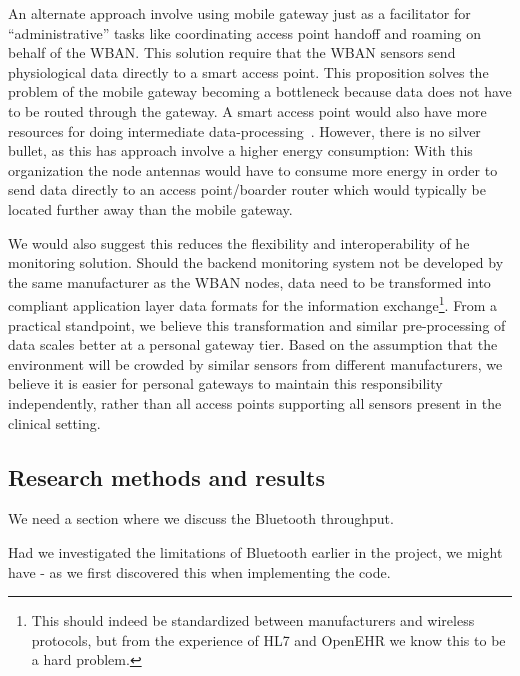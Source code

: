 An alternate approach involve using mobile gateway just as a facilitator for ``administrative'' tasks like coordinating access point handoff and roaming on behalf of the WBAN. This solution require that the WBAN sensors send physiological data directly to a smart access point. This proposition solves the problem of the mobile gateway becoming a bottleneck because data does not have to be routed through the gateway. A smart access point would also have more resources for doing intermediate data-processing~\cite{DrAmirMohammadRahmani:2014vx}. However, there is no silver bullet, as this has approach involve a higher energy consumption: With this organization the node antennas would have to consume more energy in order to send data directly to an access point/boarder router which would typically be located further away than the mobile gateway. 

We would also suggest this reduces the flexibility and interoperability of he monitoring solution. Should the backend monitoring system not be developed by the same manufacturer as the WBAN nodes, data need to be transformed into compliant application layer data formats for the information exchange\footnote{ This should indeed be standardized between manufacturers and wireless protocols, but from the experience of HL7 and OpenEHR we know this to be a hard problem.}. From a practical standpoint, we believe this transformation and similar pre-processing of data scales better at a personal gateway tier. Based on the assumption that the environment will be crowded by similar sensors from different manufacturers, we believe it is easier for personal gateways to maintain this responsibility independently, rather than all access points supporting all sensors present in the clinical setting.


\subsection{Research methods and results} %
\label{ssub:research_methods_and_results}



We need a section where we discuss the Bluetooth throughput.

Had we investigated the limitations of Bluetooth earlier in the project, we might have - as we first discovered this when implementing the code.

